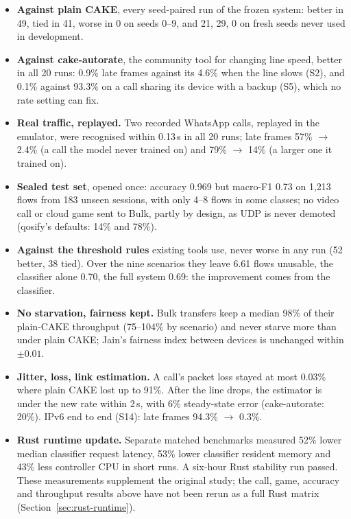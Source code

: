 \documentclass[11pt,a4paper]{article}
\begin{document}
\begin{itemize}[itemsep=1pt,topsep=4pt]
\item \textbf{Against plain CAKE}, every seed-paired run of the frozen system: better in 49, tied in 41, worse in 0 on seeds 0--9, and 21, 29, 0 on fresh seeds never used in development.
\item \textbf{Against cake-autorate}, the community tool for changing line speed, better in all 20 runs: 0.9\% late frames against its 4.6\% when the line slows (S2), and 0.1\% against 93.3\% on a call sharing its device with a backup (S5), which no rate setting can fix.
\item \textbf{Real traffic, replayed.} Two recorded WhatsApp calls, replayed in the emulator, were recognised within 0.13\,s in all 20 runs; late frames 57\% $\to$ 2.4\% (a call the model never trained on) and 79\% $\to$ 14\% (a larger one it trained on).
\item \textbf{Sealed test set}, opened once: accuracy 0.969 but macro-F1 0.73 on 1,213 flows from 183 unseen sessions, with only 4--8 flows in some classes; no video call or cloud game sent to Bulk, partly by design, as UDP is never demoted (qosify's defaults: 14\% and 78\%).
\item \textbf{Against the threshold rules} existing tools use, never worse in any run (52 better, 38 tied). Over the nine scenarios they leave 6.61 flows unusable, the classifier alone 0.70, the full system 0.69: the improvement comes from the classifier.
\item \textbf{No starvation, fairness kept.} Bulk transfers keep a median 98\% of their plain-CAKE throughput (75--104\% by scenario) and never starve more than under plain CAKE; Jain's fairness index between devices is unchanged within $\pm0.01$.
\item \textbf{Jitter, loss, link estimation.} A call's packet loss stayed at most 0.03\% where plain CAKE lost up to 91\%. After the line drops, the estimator is under the new rate within 2\,s, with 6\% steady-state error (cake-autorate: 20\%). IPv6 end to end (S14): late frames 94.3\% $\to$ 0.3\%.
\item \textbf{Rust runtime update.} Separate matched benchmarks measured 52\% lower median classifier request latency, 53\% lower classifier resident memory and 43\% less controller CPU in short runs. A six-hour Rust stability run passed. These measurements supplement the original study; the call, game, accuracy and throughput results above have not been rerun as a full Rust matrix (Section~\ref{sec:rust-runtime}).
\end{itemize}
\end{document}
